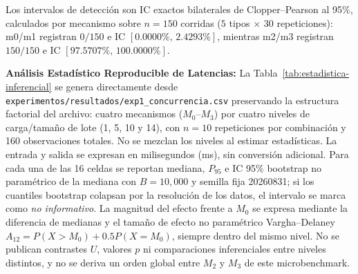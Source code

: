 \documentclass[11pt,a4paper]{article}
\begin{document}
\begin{table}[H]
\centering
\caption{Matriz Experimental de Detecci\'on Factorial por Tipo de Manipulaci\'on ($T_1$ a $T_5$).}
\label{tab:deteccion-matriz}
\end{table}
\noindent Los intervalos de detecci\'on son IC exactos bilaterales de Clopper--Pearson al 95\%, calculados por mecanismo sobre $n=150$ corridas ($5$ tipos $\times$ $30$ repeticiones): m0/m1 registran $0/150$ e IC $[0.0000\%,\,2.4293\%]$, mientras m2/m3 registran $150/150$ e IC $[97.5707\%,\,100.0000\%]$.

\noindent\textbf{An\'alisis Estad\'istico Reproducible de Latencias:} La Tabla~\ref{tab:estadistica-inferencial} se genera directamente desde \texttt{experimentos/resultados/exp1\_concurrencia.csv} preservando la estructura factorial del archivo: cuatro mecanismos ($M_0$--$M_3$) por cuatro niveles de carga/tama\~no de lote (1, 5, 10 y 14), con $n=10$ repeticiones por combinaci\'on y 160 observaciones totales. No se mezclan los niveles al estimar estad\'isticas. La entrada y salida se expresan en milisegundos (ms), sin conversi\'on adicional. Para cada una de las 16 celdas se reportan mediana, $P_{95}$ e IC 95\% bootstrap no param\'etrico de la mediana con $B=10{,}000$ y semilla fija 20260831; si los cuantiles bootstrap colapsan por la resoluci\'on de los datos, el intervalo se marca como \emph{no informativo}. La magnitud del efecto frente a $M_0$ se expresa mediante la diferencia de medianas y el tama\~no de efecto no param\'etrico Vargha--Delaney $A_{12}=P(X>M_0)+0.5P(X=M_0)$, siempre dentro del mismo nivel. No se publican contrastes $U$, valores $p$ ni comparaciones inferenciales entre niveles distintos, y no se deriva un orden global entre $M_2$ y $M_3$ de este microbenchmark.
\end{document}
